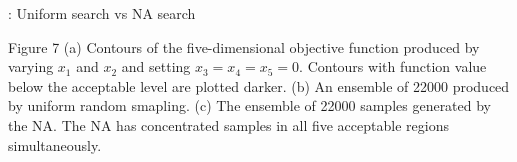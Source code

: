 

\begin{frame}{\titleprefix: Uniform search vs NA search}

  \centering

  \begin{minipage}{0.5\textwidth}
  \end{minipage}
  \begin{minipage}{0.38\textwidth}
    \tiny
    \begin{figureblock}{Figure 7}
      (a) Contours of the five-dimensional objective function produced by
      varying $x_1$ and $x_2$ and setting $x_3 = x_4 = x_5 = 0$. Contours with
      function value below the acceptable level are plotted darker.
      (b) An ensemble of 22000 produced by uniform random smapling.
      (c) The ensemble of 22000 samples generated by the NA. The NA has
      concentrated samples in all five acceptable regions simultaneously.
    \end{figureblock}
  \end{minipage}

\end{frame}
